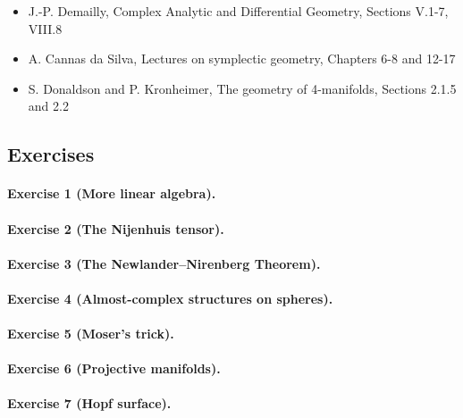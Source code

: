 \documentclass[a4paper]{article}
\theoremstyle{definition}
\theoremstyle{remark}
\begin{document}
\begin{itemize}
    \item J.-P. Demailly, Complex Analytic and Differential Geometry, Sections
        V.1-7, VIII.8

    \item A. Cannas da Silva, Lectures on symplectic geometry, Chapters 6-8 and
        12-17

    \item S. Donaldson and P. Kronheimer, The geometry of 4-manifolds, Sections
        2.1.5 and 2.2
\end{itemize}

\subsection*{Exercises}


\paragraph{Exercise 1 {\normalfont(More linear algebra)}.}

\paragraph{Exercise 2 {\normalfont(The Nijenhuis tensor)}.} 

\paragraph{Exercise 3 {\normalfont(The Newlander--Nirenberg Theorem)}.} 

\paragraph{Exercise 4 {\normalfont(Almost-complex structures on spheres)}.} 

\paragraph{Exercise 5 {\normalfont(Moser's trick)}.} 

\paragraph{Exercise 6 {\normalfont(Projective manifolds)}.} 

\paragraph{Exercise 7 {\normalfont(Hopf surface)}.} 
\end{document}
